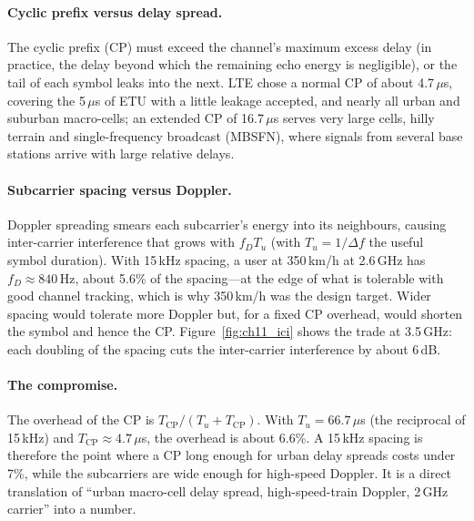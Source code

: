 \paragraph{Cyclic prefix versus delay spread.} The cyclic prefix (CP) must exceed the channel's
maximum excess delay (in practice, the delay beyond which the remaining echo energy is negligible),
or the tail of each symbol leaks into the next. LTE chose a normal CP of about 4.7\,$\mu$s, covering
the 5\,$\mu$s of ETU with a little leakage accepted, and nearly all urban and suburban macro-cells;
an extended CP of 16.7\,$\mu$s serves very large cells, hilly terrain and single-frequency broadcast
(MBSFN), where signals from several base stations arrive with large relative delays.


\paragraph{Subcarrier spacing versus Doppler.} Doppler spreading smears each subcarrier's energy into
its neighbours, causing inter-carrier interference that grows with $f_DT_u$ (with $T_u=1/\Delta f$ the
useful symbol duration). With 15\,kHz spacing, a user at 350\,km/h at 2.6\,GHz has $f_D\approx840$\,Hz,
about 5.6\% of the spacing---at the edge of what is tolerable with good channel tracking, which is why
350\,km/h was the design target. Wider spacing would tolerate more Doppler but, for a fixed CP overhead,
would shorten the symbol and hence the CP. Figure~\ref{fig:ch11_ici} shows the trade at 3.5\,GHz:
each doubling of the spacing cuts the inter-carrier interference by about 6\,dB.


\paragraph{The compromise.} The overhead of the CP is $T_{\text{CP}}/(T_u+T_{\text{CP}})$. With
$T_u=66.7\,\mu$s (the reciprocal of 15\,kHz) and $T_{\text{CP}}\approx4.7\,\mu$s, the overhead is about 6.6\%.
A 15\,kHz spacing is therefore the point where a CP long enough for urban delay spreads costs
under 7\%, while the subcarriers are wide enough for high-speed Doppler. It is a direct translation
of ``urban macro-cell delay spread, high-speed-train Doppler, 2\,GHz carrier'' into a number.

